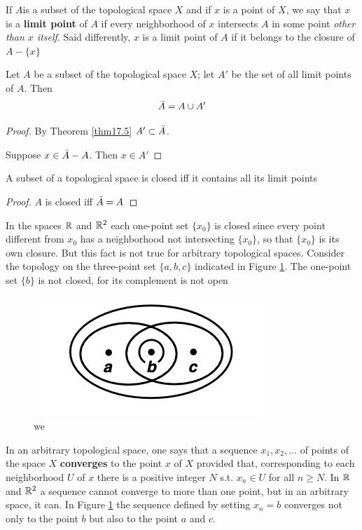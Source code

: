 \documentclass[11pt]{article}
\begin{document}
If \(A\)is a subset of the topological space \(X\) and if \(x\) is a point of \(X\), we say
that \(x\) is a \textbf{limit point} of \(A\) if every neighborhood of \(x\) intersects \(A\) in some
point \emph{other than \(x\) itself}. Said differently, \(x\) is a limit point of \(A\) if it belongs to
the closure of \(A-\{x\}\)

\begin{theorem}[]
Let \(A\) be a subset of the topological space \(X\); let \(A'\) be the set of all limit points
of \(A\). Then
\begin{equation*}
\bar{A}=A\cup A'
\end{equation*}
\end{theorem}

\begin{proof}
By Theorem \ref{thm17.5} \(A'\subset\bar{A}\).

Suppose \(x\in\bar{A}-A\). Then \(x\in A'\)
\end{proof}

\begin{corollary}[]
A subset of a topological space is closed iff it contains all its limit points
\end{corollary}

\begin{proof}
\(A\) is closed iff \(\bar{A}=A\)
\end{proof}

In the spaces \(\mathbb{R}\) and \(\mathbb{R}^2\) each one-point set \(\{x_0\}\) is closed since every point different
from \(x_0\) has a neighborhood not intersecting \(\{x_0\}\), so that \(\{x_0\}\) is its own
closure. But this fact is not true for arbitrary topological spaces. Consider the topology on the
three-point set \(\{a,b,c\}\) indicated in Figure \ref{fig:17.3}. The one-point set \(\{b\}\) is not
closed, for its complement is not open

\begin{figure}[htbp]
\centering
\includegraphics[width=.3\textwidth]{../images/Topology/2.png}
\caption{\label{fig:17.3}we}
\end{figure}

In an arbitrary topological space, one says that a sequence \(x_1,x_2,\dots\) of points of the
space \(X\) \textbf{converges} to the point \(x\) of \(X\) provided that, corresponding to each
neighborhood \(U\) of \(x\) there is a positive integer \(N\) s.t. \(x_n\in U\) for all \(n\ge N\).
In \(\mathbb{R}\) and \(\mathbb{R}^2\) a sequence cannot converge to more than one point, but in an arbitrary space,
it can. In Figure \ref{fig:17.3} the sequence defined by setting \(x_n=b\) converges not only to
the point \(b\) but also to the point \(a\) and \(c\).
\end{document}

